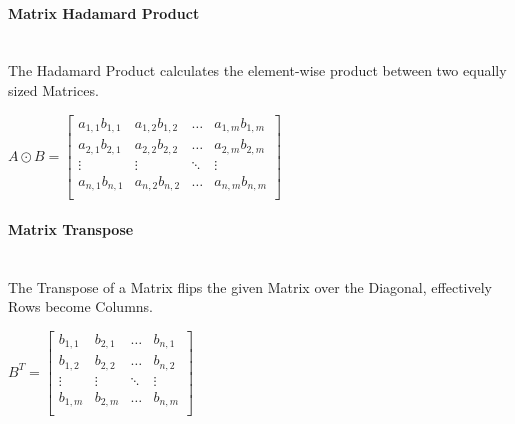 \begin{flushleft}
                \paragraph{Matrix Hadamard Product} \mbox{} \\
                    \vspace{0.2cm}
                    The Hadamard Product calculates the element-wise product between two equally sized Matrices. \\

                    \begin{center}
                        $
                        A \odot B =
                        \begin{bmatrix}
                            a_{1,1}b_{1,1} & a_{1,2}b_{1,2} & \hdots  & a_{1,m}b_{1,m} \\
                            a_{2,1}b_{2,1} & a_{2,2}b_{2,2} & \hdots  & a_{2,m}b_{2,m} \\
                            \vdots         & \vdots         & \ddots  & \vdots         \\
                            a_{n,1}b_{n,1} & a_{n,2}b_{n,2} & \hdots  & a_{n,m}b_{n,m} \\
                        \end{bmatrix}
                        $
                    \end{center}

                \paragraph{Matrix Transpose} \mbox{} \\
                    \vspace{0.2cm}
                    The Transpose of a Matrix flips the given Matrix over the Diagonal, effectively Rows become Columns. \\

                    \begin{center}
                        $
                        B^{T} = 
                        \begin{bmatrix}
                            b_{1,1} & b_{2,1} & \hdots  & b_{n,1} \\
                            b_{1,2} & b_{2,2} & \hdots  & b_{n,2} \\
                            \vdots  & \vdots  & \ddots  & \vdots  \\
                            b_{1,m} & b_{2,m} & \hdots  & b_{n,m} \\
                        \end{bmatrix}
                        $
                    \end{center}           

\end{flushleft}
